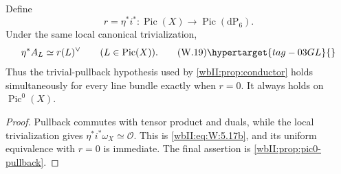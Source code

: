 \begin{proposition}
\hypertarget{tag-03IG}{}\label{wbII:prop:all-pic-restriction}

Define
\[
 r=\eta^*i^*:\operatorname{Pic}(X)\longrightarrow
 \operatorname{Pic}(\mathrm{dP}_6).
\]
Under the same local canonical trivialization,
\[
 \eta^*A_L\simeq r(L)^\vee
 \qquad(L\in\operatorname{Pic}(X)).
\tag{W.19}\hypertarget{tag-03GL}{}\label{wbII:eq:W:5.17b}
\]
Thus the trivial-pullback hypothesis used by
\cref{wbII:prop:conductor} holds simultaneously for every line bundle exactly
when $r=0$.  It always holds on $\operatorname{Pic}^0(X)$.
\end{proposition}



\begin{proof}
Pullback commutes with tensor product and duals, while the local
trivialization gives $\eta^*i^*\omega_X\simeq\mathcal O$.  This is \eqref{wbII:eq:W:5.17b},
and its uniform equivalence with $r=0$ is immediate.  The final assertion is
\cref{wbII:prop:pic0-pullback}.

\end{proof}
